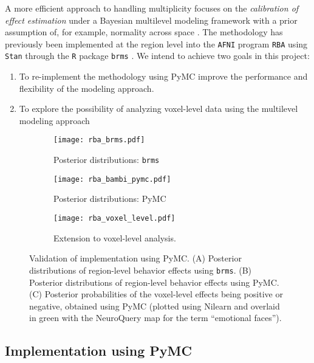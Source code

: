 \documentclass[../main.tex]{subfiles}
\begin{document}
A more efficient approach to handling multiplicity focuses on the \textit{calibration of effect estimation} under a Bayesian multilevel modeling framework with a prior assumption of, for example, normality across space \parencite{chenHandlingMultiplicityNeuroimaging2019}. The methodology has previously been implemented at the region level into the \texttt{AFNI} program \texttt{RBA} \parencite{chen_sources_2022} using \texttt{Stan} through the \texttt{R} package \texttt{brms} \parencite{burknerBrmsPackageBayesian2017}. We intend to achieve two goals in this project: 
\begin{enumerate}[label=(\roman*),nolistsep]
    \item To re-implement the methodology using PyMC improve the performance and flexibility of the modeling approach.
    \item To explore the possibility of analyzing voxel-level data using the multilevel modeling approach
\end{enumerate}

\begin{figure*}[t!]
\centering
\begin{subfigure}{.5\textwidth}
    \centering
    \caption{Posterior distributions: \texttt{brms}}
    \texttt{[image: rba\_brms.pdf]}
    \label{fig:sub1}
\end{subfigure}%
\begin{subfigure}{.5\textwidth}
    \centering
    \caption{Posterior distributions: PyMC}
    \texttt{[image: rba\_bambi\_pymc.pdf]}
    \label{fig:sub2}
\end{subfigure}
\begin{subfigure}{.9\textwidth}
    \centering
    \caption{Extension to voxel-level analysis. }
    \texttt{[image: rba\_voxel\_level.pdf]}
    \label{fig:vox}
\end{subfigure}

\caption{Validation of implementation using PyMC. (A) Posterior distributions of region-level behavior effects using \texttt{brms}. (B) Posterior distributions of region-level behavior effects using PyMC. (C) Posterior probabilities of the voxel-level effects being positive or negative, obtained using PyMC (plotted using Nilearn and overlaid in green with the NeuroQuery \parencite{dockes_neuroquery_2020} map for the term ``emotional faces'').}
\label{fig:rba}
\end{figure*}
\subsection{Implementation using PyMC}
\end{document}
